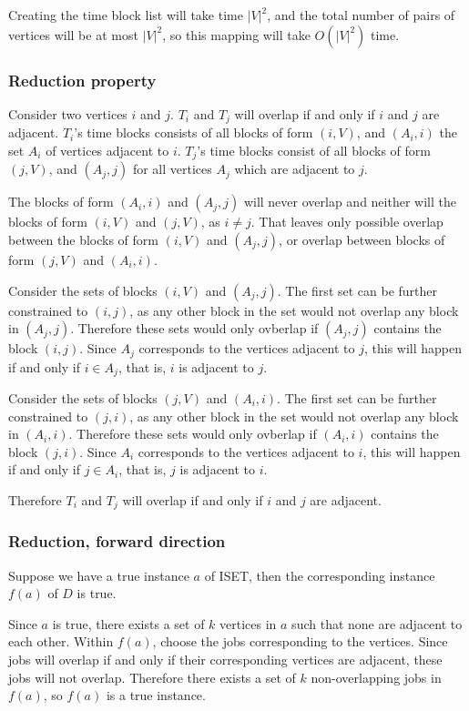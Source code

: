 \documentclass[11pt]{article}
\begin{document}
Creating the time block list will take time $|V|^2$, and the total number of pairs of vertices will be at most $|V|^2$, so this mapping will take $O(|V|^2)$ time.

\subsubsection*{Reduction property}

Consider two vertices $i$ and $j$. $T_i$ and $T_j$ will overlap if and only if $i$ and $j$ are adjacent. $T_i$'s time blocks consists of all blocks of form $(i, V)$, and $(A_i, i)$ the set $A_i$ of vertices adjacent to $i$. $T_j$'s time blocks consist of all blocks of form $(j, V)$, and $(A_j, j)$ for all vertices $A_j$ which are adjacent to $j$.

The blocks of form $(A_i,i)$ and $(A_j, j)$ will never overlap and neither will the blocks of form $(i, V)$ and $(j, V)$, as $i \neq j$. That leaves only possible overlap between the blocks of form $(i, V)$ and $(A_j, j)$, or overlap between blocks of form $(j, V)$ and $(A_i, i)$. 

Consider the sets of blocks $(i, V)$ and $(A_j, j)$. The first set can be further constrained to $(i, j)$, as any other block in the set would not overlap any block in $(A_j, j)$. Therefore these sets would only ovberlap if $(A_j, j)$ contains the block $(i, j)$. Since $A_j$ corresponds to the vertices adjacent to $j$, this will happen if and only if $i \in A_j$, that is, $i$ is adjacent to $j$. 

Consider the sets of blocks $(j, V)$ and $(A_i, i)$. The first set can be further constrained to $(j, i)$, as any other block in the set would not overlap any block in $(A_i, i)$. Therefore these sets would only ovberlap if $(A_i, i)$ contains the block $(j, i)$. Since $A_i$ corresponds to the vertices adjacent to $i$, this will happen if and only if $j \in A_i$, that is, $j$ is adjacent to $i$. 

Therefore $T_i$ and $T_j$ will overlap if and only if $i$ and $j$ are adjacent.


\subsubsection*{Reduction, forward direction}
Suppose we have a true instance $a$ of ISET, then the corresponding instance $f(a)$ of $D$ is true. 

Since $a$ is true, there exists a set of $k$ vertices in $a$ such that none are adjacent to each other. Within $f(a)$, choose the jobs corresponding to the vertices. Since jobs will overlap if and only if their corresponding vertices are adjacent, these jobs will not overlap. Therefore there exists a set of $k$ non-overlapping jobs in $f(a)$, so $f(a)$ is a true instance.
\end{document}
